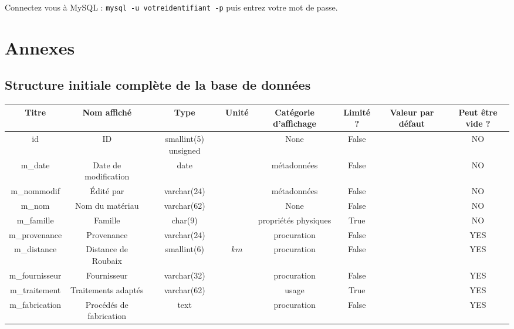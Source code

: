 \documentclass[12pt,a4paper]{article}
\begin{document}
        Connectez vous à MySQL : \verb+mysql -u votreidentifiant -p+ puis entrez votre mot de passe.


\clearpage
\appendix
\section*{Annexes}
    \subsection{Structure initiale complète de la base de données}\label{structureinitiale}
    \begin{table}
        \begin{center}
            \footnotesize
            \begin{tabular}{|c|c|c|c|c|c|c|c|}
                \hline
                Titre & Nom affiché & Type & Unité & Catégorie d'affichage & Limité ? & Valeur par défaut & Peut être vide ? \\
                \hline
                id & ID & smallint(5) unsigned & $ $ & None & False &  & NO \\
                \hline
                m\_date & Date de modification & date & $ $ & métadonnées & False &  & NO \\
                \hline
                m\_nommodif & Édité par & varchar(24) & $ $ & métadonnées & False &  & NO \\
                \hline
                m\_nom & Nom du matériau & varchar(62) & $ $ & None & False &  & NO \\
                \hline
                m\_famille & Famille & char(9) & $ $ & propriétés physiques & True &  & NO \\
                \hline
                m\_provenance & Provenance & varchar(24) & $ $ & procuration & False &  & YES \\
                \hline
                m\_distance & Distance de Roubaix & smallint(6) & $km$ & procuration & False &  & YES \\
                \hline
                m\_fournisseur & Fournisseur & varchar(32) & $ $ & procuration & False &  & YES \\
                \hline
                m\_traitement & Traitements adaptés & varchar(62) & $ $ & usage & True &  & YES \\
                \hline
                m\_fabrication & Procédés de fabrication & text & $ $ & procuration & False &  & YES \\

\end{tabular}
\end{center}
\end{table}
\end{document}
